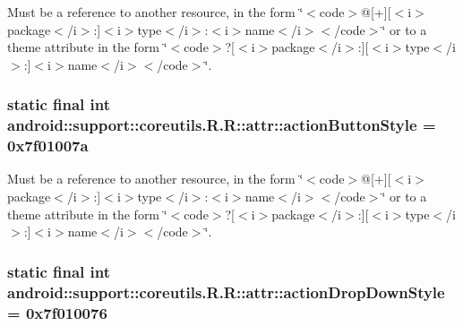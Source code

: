 Must be a reference to another resource, in the form \char`\"{}$<$code$>$@\mbox{[}+\mbox{]}\mbox{[}$<$i$>$package$<$/i$>$:\mbox{]}$<$i$>$type$<$/i$>$:$<$i$>$name$<$/i$>$$<$/code$>$\char`\"{} or to a theme attribute in the form \char`\"{}$<$code$>$?\mbox{[}$<$i$>$package$<$/i$>$:\mbox{]}\mbox{[}$<$i$>$type$<$/i$>$:\mbox{]}$<$i$>$name$<$/i$>$$<$/code$>$\char`\"{}. \hypertarget{classandroid_1_1support_1_1coreutils_1_1_r_1_1attr_1aa21c38c73d0c26f62ecebddd051668}{
\subsubsection[{actionButtonStyle}]{\setlength{\rightskip}{0pt plus 5cm}static final int android::support::coreutils.R.R::attr::actionButtonStyle = 0x7f01007a}}
\label{classandroid_1_1support_1_1coreutils_1_1_r_1_1attr_1aa21c38c73d0c26f62ecebddd051668}


Must be a reference to another resource, in the form \char`\"{}$<$code$>$@\mbox{[}+\mbox{]}\mbox{[}$<$i$>$package$<$/i$>$:\mbox{]}$<$i$>$type$<$/i$>$:$<$i$>$name$<$/i$>$$<$/code$>$\char`\"{} or to a theme attribute in the form \char`\"{}$<$code$>$?\mbox{[}$<$i$>$package$<$/i$>$:\mbox{]}\mbox{[}$<$i$>$type$<$/i$>$:\mbox{]}$<$i$>$name$<$/i$>$$<$/code$>$\char`\"{}. \hypertarget{classandroid_1_1support_1_1coreutils_1_1_r_1_1attr_4e458123b6f40b13db560b72b0e63de6}{
\subsubsection[{actionDropDownStyle}]{\setlength{\rightskip}{0pt plus 5cm}static final int android::support::coreutils.R.R::attr::actionDropDownStyle = 0x7f010076}}
\label{classandroid_1_1support_1_1coreutils_1_1_r_1_1attr_4e458123b6f40b13db560b72b0e63de6}


